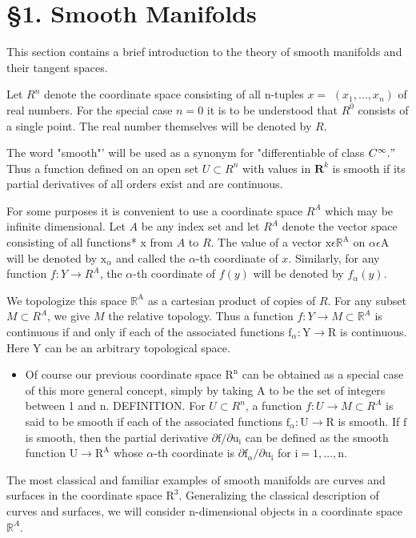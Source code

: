 \documentclass[10pt]{article}
\begin{document}
\section{§1. Smooth Manifolds}
This section contains a brief introduction to the theory of smooth manifolds and their tangent spaces.

Let $R^{n}$ denote the coordinate space consisting of all n-tuples $x=$ $\left(x_{1}, \ldots, x_{n}\right)$ of real numbers. For the special case $n=0$ it is to be understood that $R^{0}$ consists of a single point. The real number themselves will be denoted by $R$.

The word "smooth"' will be used as a synonym for "differentiable of class $C^{\infty} . "$ Thus a function defined on an open set $U \subset R^{n}$ with values in $\mathbf{R}^{k}$ is smooth if its partial derivatives of all orders exist and are continuous.

For some purposes it is convenient to use a coordinate space $R^{A}$ which may be infinite dimensional. Let $A$ be any index set and let $R^{A}$ denote the vector space consisting of all functions* $\mathrm{x}$ from $A$ to $R$. The value of a vector $\mathrm{x} \epsilon \mathbb{R}^{\mathrm{A}}$ on $\alpha \epsilon \mathrm{A}$ will be denoted by $\mathrm{x}_{\alpha}$ and called the $\alpha$-th coordinate of $x$. Similarly, for any function $f: Y \rightarrow R^{A}$, the $\alpha$-th coordinate of $f(y)$ will be denoted by $f_{\alpha}(y)$.

We topologize this space $\mathbb{R}^{\mathrm{A}}$ as a cartesian product of copies of $R$. For any subset $M \subset R^{A}$, we give $M$ the relative topology. Thus a function $f: Y \rightarrow M \subset \mathbb{R}^{A}$ is continuous if and only if each of the associated functions $\mathrm{f}_{\alpha}: \mathrm{Y} \rightarrow \mathrm{R}$ is continuous. Here $\mathrm{Y}$ can be an arbitrary topological space.

\begin{itemize}
  \item Of course our previous coordinate space $\mathrm{R}^{\mathrm{n}}$ can be obtained as a special case of this more general concept, simply by taking A to be the set of integers between 1 and $\mathrm{n}$. DEFINITION. For $U \subset R^{n}$, a function $f: U \rightarrow M \subset R^{A}$ is said to be smooth if each of the associated functions $\mathrm{f}_{\alpha}: \mathrm{U} \rightarrow \mathrm{R}$ is smooth. If $\mathrm{f}$ is smooth, then the partial derivative $\partial \mathrm{f} / \partial \mathrm{u}_{\mathrm{i}}$ can be defined as the smooth function $\mathrm{U} \rightarrow \mathrm{R}^{\mathrm{A}}$ whose $\alpha$-th coordinate is $\partial \mathrm{f}_{\alpha} / \partial \mathrm{u}_{\mathrm{i}}$ for $\mathrm{i}=1, \ldots, \mathrm{n}$.
\end{itemize}
The most classical and familiar examples of smooth manifolds are curves and surfaces in the coordinate space $\mathrm{R}^{3}$. Generalizing the classical description of curves and surfaces, we will consider n-dimensional objects in a coordinate space $\mathbb{R}^{A}$.
\end{document}
